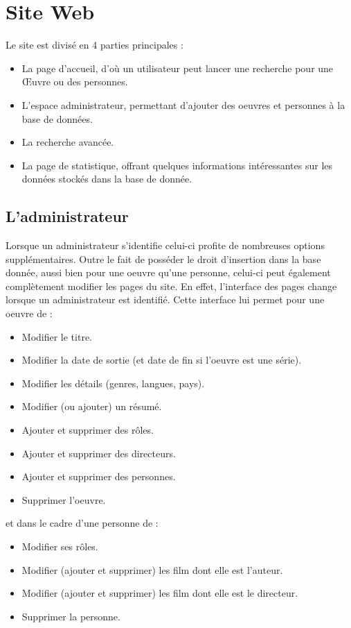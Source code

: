 \documentclass[10pt,a4paper]{article}
\begin{document}
\newpage
\section{Site Web}

Le site est divisé en 4 parties principales : 
\vskip 3pt
\begin{itemize}
\item La page d’accueil, d'où un utilisateur peut lancer une recherche pour une Œuvre ou des personnes.
\item L'espace administrateur, permettant d'ajouter des oeuvres et personnes à la base de données.
\item La recherche avancée.
\item La page de statistique, offrant quelques informations intéressantes sur les données stockés dans la base de donnée.
\end{itemize}

\subsection{L'administrateur}
Lorsque un administrateur s'identifie celui-ci profite de nombreuses options supplémentaires. Outre le fait de posséder le droit d'insertion dans la base donnée, aussi bien pour une oeuvre qu'une personne, celui-ci peut également complètement modifier les pages du site. En effet, l'interface des pages change lorsque un administrateur est identifié. Cette interface lui permet pour une oeuvre de :
\vskip 3pt
\begin{itemize}
\item Modifier le titre.
\item Modifier la date de sortie (et date de fin si l'oeuvre est une série).
\item Modifier les détails (genres, langues, pays).
\item Modifier (ou ajouter) un résumé.
\item Ajouter et supprimer des rôles.
\item Ajouter et supprimer des directeurs.
\item Ajouter et supprimer des personnes.
\item Supprimer l'oeuvre.
\end{itemize}

\vskip 10pt
et dans le cadre d'une personne de :
\begin{itemize}
\item Modifier ses rôles.
\item Modifier (ajouter et supprimer) les film dont elle est l’auteur.
\item Modifier (ajouter et supprimer) les film dont elle est le directeur.
\item Supprimer la personne.
\end{itemize}
\end{document}
